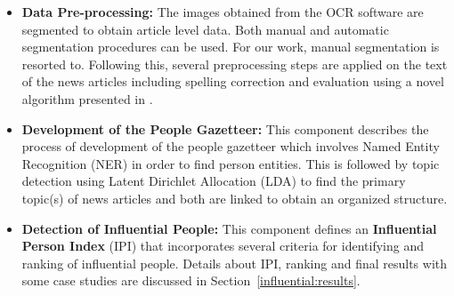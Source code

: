 \begin{itemize}
\item \textbf{Data Pre-processing: } The images obtained from the OCR software are segmented to obtain article level data. Both manual and automatic segmentation procedures can be used. 
For our work, manual segmentation is resorted to.
Following this, several preprocessing steps are applied on the text of the news
articles including  spelling correction and evaluation using a novel algorithm presented in \cite{Gupta_14a}.

\item \textbf{Development of the People Gazetteer: }This component describes the process of development
of the people gazetteer which involves Named Entity Recognition (NER) in order to find person
entities. This is followed by topic detection using Latent Dirichlet Allocation (LDA) to find the primary topic(s) of news articles
and both are linked to obtain an organized structure.

\item \textbf{Detection of Influential People: } This component defines an \textbf{Influential Person Index}
(IPI) that incorporates several criteria for identifying and ranking of influential
people. Details about IPI, ranking and final results with some case studies are discussed in Section~\ref{influential:results}.
\end{itemize}